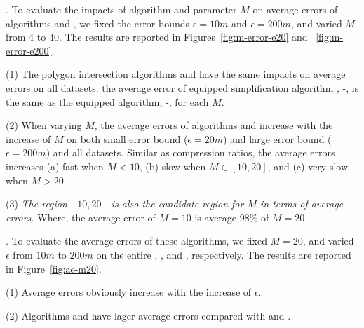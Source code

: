 .
To evaluate the impacts of algorithm \rpia and parameter $M$ on average errors of algorithms \cist and \cista, we fixed the error bounds \textcolor[rgb]{1.00,0.00,0.00}{$\epsilon =10m$} and $\epsilon =200m$, and varied $M$ from $4$ to $40$.
The results are reported in Figures~\ref{fig:m-error-e20} and ~\ref{fig:m-error-e200}.


\ni(1) The polygon intersection algorithms \rpia and \cpia have the same impacts on average errors on all datasets. \eg the average error of \rpia equipped simplification algorithm \cist, \ie \cist-\rpia, is the same as the \cpia equipped algorithm, \ie \cist-\cpia, for each $M$.


\ni(2) When varying $M$, the average errors of algorithms \cist and \cista increase with the increase of $M$ on both small error bound \textcolor[rgb]{1.00,0.00,0.00}{(\eg $\epsilon = 20m$)} and large error bound (\eg $\epsilon = 200m$) and all datasets.
Similar as compression ratios, the average errors increases (a) fast when $M < 10$, (b) slow when $M \in [10, 20]$, and (c) very slow when $M  > 20$.


\ni(3) \emph{The region $[10, 20]$ is also the candidate region for $M$ in terms of average errors.}
Where, the average error of $M=10$ is average \textcolor[rgb]{1.00,0.00,0.00}{$98\%$} of $M=20$.




.
To evaluate the average errors of these algorithms, we fixed $M=20$, and varied $\epsilon$ from $10m$ to $200m$ on the entire \truck, \sercar, \geolife and \pricar, respectively.
The results are reported in Figure~\ref{fig:ae-m20}. %

\ni(1) Average errors obviously increase with the increase of $\epsilon$.

\ni(2) Algorithms \cist and \cista have lager average errors compared with \dpa and \squishe.







